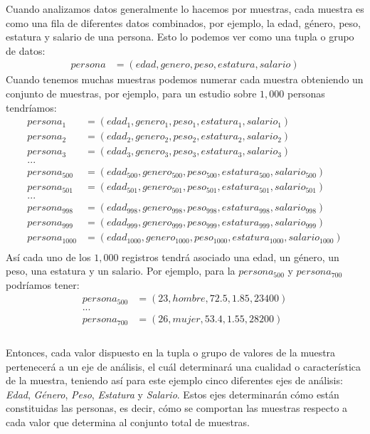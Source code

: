 \documentclass{article}
\begin{document}
Cuando analizamos datos generalmente lo hacemos por muestras, cada muestra es como una fila de diferentes datos combinados, por ejemplo, la edad, género, peso, estatura y salario de una persona. Esto lo podemos ver como una tupla o grupo de datos:
\begin{equation}
    \begin{aligned}
        persona &= (edad, genero, peso, estatura, salario)
    \end{aligned}
\end{equation}
Cuando tenemos muchas muestras podemos numerar cada muestra obteniendo un conjunto de muestras, por ejemplo, para un estudio sobre $1,000$ personas tendríamos:
\begin{equation}
    \begin{aligned}
        persona_1 &= (edad_1, genero_1, peso_1, estatura_1, salario_1) \\
        persona_2 &= (edad_2, genero_2, peso_2, estatura_2, salario_2) \\
        persona_3 &= (edad_3, genero_3, peso_3, estatura_3, salario_3) \\
        ... \\
        persona_{500} &= (edad_{500}, genero_{500}, peso_{500}, estatura_{500}, salario_{500}) \\
        persona_{501} &= (edad_{501}, genero_{501}, peso_{501}, estatura_{501}, salario_{501}) \\
        ... \\
        persona_{998} &= (edad_{998}, genero_{998}, peso_{998}, estatura_{998}, salario_{998}) \\
        persona_{999} &= (edad_{999}, genero_{999}, peso_{999}, estatura_{999}, salario_{999}) \\
        persona_{1000} &= (edad_{1000}, genero_{1000}, peso_{1000}, estatura_{1000}, salario_{1000}) \\
    \end{aligned}
\end{equation}
Así cada uno de los $1,000$ registros tendrá asociado una edad, un género, un peso, una estatura y un salario. Por ejemplo, para la $persona_{500}$ y $persona_{700}$ podríamos tener:
\begin{equation}
    \begin{aligned}
        persona_{500} &= (23, hombre, 72.5, 1.85, 23400) \\
        ... \\
        persona_{700} &= (26, mujer, 53.4, 1.55, 28200) \\
    \end{aligned}
\end{equation}
\\[12pt]
Entonces, cada valor dispuesto en la tupla o grupo de valores de la muestra pertenecerá a un eje de análisis, el cuál determinará una cualidad o característica de la muestra, teniendo así para este ejemplo cinco diferentes ejes de análisis: \textit{Edad}, \textit{Género}, \textit{Peso}, \textit{Estatura} y \textit{Salario}. Estos ejes determinarán cómo están constituidas las personas, es decir, cómo se comportan las muestras respecto a cada valor que determina al conjunto total de muestras.
\end{document}

